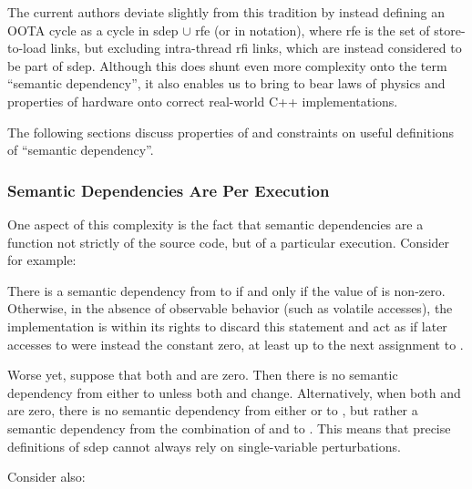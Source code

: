 \documentclass[10]{article}
\begin{document}
The current authors deviate slightly from this tradition by instead
defining an OOTA cycle as a cycle in sdep $\cup$ rfe (or
 in  notation), where rfe is the
set of store-to-load links, but excluding intra-thread rfi links, which
are instead considered to be part of sdep.
Although this does shunt even more complexity onto the term
``semantic dependency'', it also enables us to bring to bear
laws of physics and properties of hardware onto correct real-world
C++ implementations.%

The following sections discuss properties of and constraints on
useful definitions of ``semantic dependency''.

\subsubsection{Semantic Dependencies Are Per Execution}
\label{sec:Semantic Dependencies Are Per Execution}

One aspect of this complexity is the fact that semantic dependencies
are a function not strictly of the source code, but of a particular
execution.
Consider for example:

\begin{quote}
\end{quote}

There is a semantic dependency from  to  if and only if the
value of  is non-zero.
Otherwise, in the absence of observable behavior (such as volatile
accesses), the implementation is within its rights to discard this
statement and act as if later accesses to  were instead the
constant zero, at least up to the next assignment to .

Worse yet, suppose that both  and  are zero.
Then there is no semantic dependency from either to  unless both
 and  change.
Alternatively, when both  and  are zero, there is no semantic
dependency from either  or  to , but rather a semantic
dependency from the combination of  and  to .
This means that precise definitions of sdep cannot always rely on
single-variable perturbations.

Consider also:

\begin{quote}
\end{quote}
\end{document}
